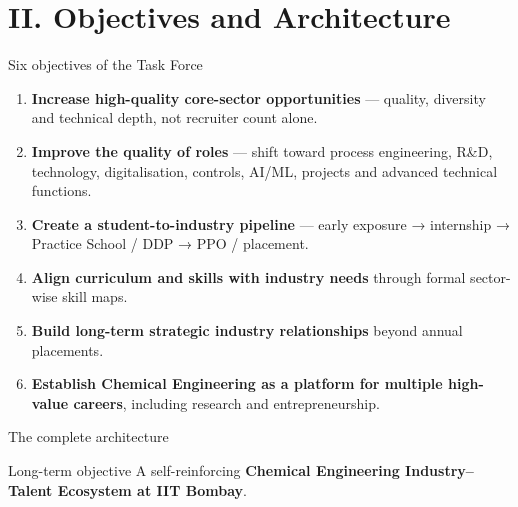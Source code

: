 \documentclass[aspectratio=169,11pt]{beamer}
\newcommand{\key}[1]{\textbf{\color{IITblue}#1}}
\begin{document}
\section{II. Objectives and Architecture}
\begin{frame}{Six objectives of the Task Force}
\begin{enumerate}
\item \key{Increase high-quality core-sector opportunities} — quality, diversity and technical depth, not recruiter count alone.
\item \key{Improve the quality of roles} — shift toward process engineering, R\&D, technology, digitalisation, controls, AI/ML, projects and advanced technical functions.
\item \key{Create a student-to-industry pipeline} — early exposure → internship → Practice School / DDP → PPO / placement.
\item \key{Align curriculum and skills with industry needs} through formal sector-wise skill maps.
\item \key{Build long-term strategic industry relationships} beyond annual placements.
\item \key{Establish Chemical Engineering as a platform for multiple high-value careers}, including research and entrepreneurship.
\end{enumerate}
\end{frame}

\begin{frame}{The complete architecture}
\centering
{}
\vspace{3mm}
\begin{alertblock}{Long-term objective}
A self-reinforcing \key{Chemical Engineering Industry--Talent Ecosystem at IIT Bombay}.
\end{alertblock}
\end{frame}
\end{document}
